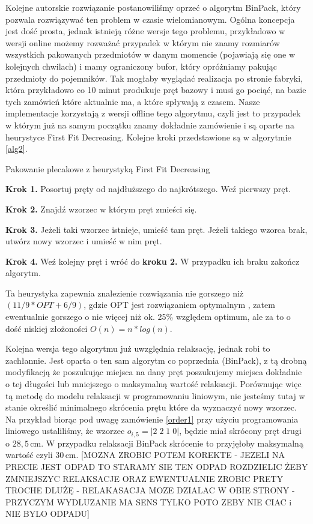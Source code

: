 Kolejne autorskie rozwiązanie postanowiliśmy oprzeć o algorytm BinPack, który pozwala rozwiązywać ten problem w czasie wielomianowym. Ogólna koncepcja jest dość prosta, jednak istnieją różne wersje tego problemu, przykładowo w wersji online możemy rozważać przypadek w którym nie znamy rozmiarów wszystkich pakowanych przedmiotów w danym momencie (pojawiają się one w kolejnych chwilach) i mamy ograniczony bufor, który opróżniamy pakując przedmioty do pojemników. Tak mogłaby wyglądać realizacja po stronie fabryki, która przykładowo co 10 minut produkuje pręt bazowy i musi go pociąć, na bazie tych zamówień które aktualnie ma, a które spływają z czasem. Nasze implementacje korzystają z wersji offline tego algorytmu, czyli jest to przypadek w którym już na samym początku znamy dokładnie zamówienie i są oparte na heurystyce First Fit Decreasing. Kolejne kroki przedstawione są w algorytmie \ref{alg2}.
\begin{algorithm}[!t]
\raggedright
\caption{Pakowanie plecakowe z heurystyką First Fit Decreasing}
\label{alg2}
\textbf{Krok 1.} Posortuj pręty od najdłuższego do najkrótszego. Weź pierwszy pręt.
\smallskip

\textbf{Krok 2.} Znajdź wzorzec w którym pręt zmieści się.
\smallskip

\textbf{Krok 3.} Jeżeli taki wzorzec istnieje, umieść tam pręt. Jeżeli takiego wzorca brak, utwórz nowy wzorzec i umieść w nim pręt.
\smallskip

\textbf{Krok 4.} Weź kolejny pręt i wróć do \textbf{kroku 2.} W przypadku ich braku zakończ algorytm.
\end{algorithm}
Ta heurystyka zapewnia znalezienie rozwiązania nie gorszego niż \((11/9*OPT + 6/9)\), gdzie OPT jest rozwiązaniem optymalnym \cite{bin-packing-optimal}, zatem ewentualnie gorszego o nie więcej niż ok. 25\% względem optimum, ale za to o dość niskiej złożoności $O(n) = n * log(n)$.

Kolejna wersja tego algorytmu już uwzględnia relaksację, jednak robi to zachłannie. Jest oparta o ten sam algorytm co poprzednia (BinPack), z tą drobną modyfikacją że poszukując miejsca na dany pręt poszukujemy miejsca dokładnie o tej długości lub mniejszego o maksymalną wartość relaksacji. Porównując więc tą metodę do modelu relaksacji w programowaniu liniowym, nie jesteśmy tutaj w stanie określić minimalnego skrócenia prętu które da wyznaczyć nowy wzorzec. Na przykład biorąc pod uwagę zamówienie \ref{order1} przy użyciu programowania liniowego ustaliliśmy, że wzorzec \(o_{i,5} = |2 \; 2 \; 1 \; 0|\), będzie miał skrócony pręt drugi o \(28{,}5 \, \text{cm}\). W przypadku relaksacji BinPack skrócenie to przyjęłoby maksymalną wartość czyli \(30 \, \text{cm}\).
[MOZNA ZROBIC POTEM KOREKTE - JEZELI NA PRECIE JEST ODPAD TO STARAMY SIE TEN ODPAD ROZDZIELIC ŻEBY ZMNIEJSZYC RELAKSACJE ORAZ EWENTUALNIE ZROBIC PRETY TROCHE DLUŻĘ - RELAKASACJA MOZE DZIALAC W OBIE STRONY - PRZYCZYM WYDLUZANIE MA SENS TYLKO POTO ZEBY NIE CIAC i NIE BYLO ODPADU]

